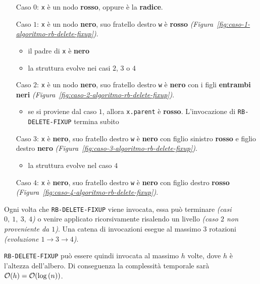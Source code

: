 \documentclass[italian, 10pt]{article}
\begin{document}
\begin{itemize}
  \item[Caso \(0\):] \texttt{x} è un nodo \textbf{rosso}, oppure è la \textbf{radice}.
  \item[Caso \(1\):] \texttt{x} è un nodo \textbf{nero}, suo fratello destro \texttt{w} è \textbf{rosso} \textit{(Figura~\ref{fig:caso-1-algoritmo-rb-delete-fixup})}.
    \begin{itemize}
      \item il padre di \texttt{x} è \textbf{nero}
      \item la struttura evolve nei casi \(2\), \(3\) o \(4\)
    \end{itemize}
  \item[Caso \(2\):] \texttt{x} è un nodo \textbf{nero}, suo fratello destro \texttt{w} è \textbf{nero} con i figli \textbf{entrambi neri} \textit{(Figura~\ref{fig:caso-2-algoritmo-rb-delete-fixup})}.
    \begin{itemize}
      \item se si proviene dal caso \(1\), allora \texttt{x.parent} è \textbf{rosso}. L'invocazione di \texttt{RB-DELETE-FIXUP} termina subito
    \end{itemize}
  \item[Caso \(3\):] \texttt{x} è \textbf{nero}, suo fratello destro \texttt{w} è \textbf{nero} con figlio sinistro \textbf{rosso} e figlio destro \textbf{nero} \textit{(Figura~\ref{fig:caso-3-algoritmo-rb-delete-fixup})}.
    \begin{itemize}
      \item la struttura evolve nel caso \(4\)
    \end{itemize}\textbf{}
  \item[Caso \(4\):] \texttt{x} è \textbf{nero}, suo fratello destro \texttt{w} è \textbf{nero} con figlio destro \textbf{rosso} \textit{(Figura~\ref{fig:caso-4-algoritmo-rb-delete-fixup})}.
\end{itemize}

Ogni volta che \texttt{RB-DELETE-FIXUP} viene invocata, essa può terminare \textit{(casi \(0,\ 1,\ 3,\ 4\))} o venire applicato ricorsivamente risalendo un livello \textit{(caso \(2\) non proveniente da \(1\))}.
Una catena di invocazioni esegue al massimo \(3\) rotazioni \textit{(evoluzione \(1 \rightarrow 3 \rightarrow 4\))}.

\texttt{RB-DELETE-FIXUP} può essere quindi invocata al massimo \(h\) volte, dove \(h\) è l'altezza dell'albero.
Di conseguenza la complessità temporale sarà \(\mathcal{O}(h) = \mathcal{O}(\log{(n)})\).
\end{document}
